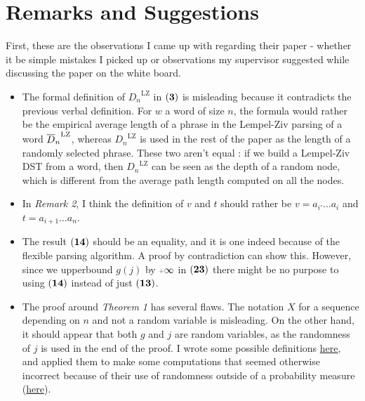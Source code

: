 \section{Remarks and Suggestions}

First, these are the observations I came up with regarding their paper - whether
it be simple mistakes I picked up or observations my supervisor suggested while
discussing the paper on the white board.

\begin{itemize}

\item The formal definition of ${D_n}^{\text{LZ}}$ in $\mathbf{(3)}$ is 
      misleading because it contradicts the previous verbal definition.
      For $w$ a word of size $n$, the formula
      would rather be the empirical average length of a phrase in the Lempel-Ziv
      parsing of a word ${\overline{D}_n}^{\text{LZ}}$, whereas
      ${D_n}^{\text{LZ}}$ is used in the rest of the paper as the length
      of a randomly selected phrase. These two aren't equal :
      if we build a Lempel-Ziv DST from a word, then 
      ${D_n}^{\text{LZ}}$ can be seen as the depth of a random node, 
      which is different from the average path length computed 
      on all the nodes. 

\item In \emph{Remark 2}, I think the definition of $v$ and 
      $t$ should rather be 
      $ v = a_{i'} \dots a_{i} $ and
      $ t = a_{i+1} \dots a_n$. 

\item The result $\mathbf{(14)}$ should be an equality, and it is one indeed
      because of the flexible parsing algorithm. A proof by contradiction
      can show this. However, since we upperbound $g(j)$ by $\pinf$ in 
      $\mathbf{(23)}$ there might be no purpose to using $\mathbf{(14)}$ 
      instead of just $\mathbf{(13)}$. 

\item The proof around \emph{Theorem 1} has several flaws.
      The notation $X$ for a sequence depending on $n$ and not a 
      random variable is misleading. On the other hand, it should appear
      that both $g$ and $j$ are random variables, as the randomness of 
      $j$ is used in the end of the proof.
      I wrote some possible definitions \hyperlink{definitions}{here},
      and applied them to make some computations that seemed otherwise
      incorrect because of their use of randomness outside of a probability
      measure (\hyperlink{computations}{here}).


\end{itemize}
